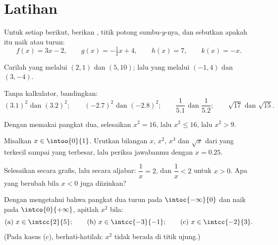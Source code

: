 \section{Latihan}

\begin{exercise}[$\star$]\label{exo:g10:reffunc:1}
Untuk setiap  berikut, berikan , titik potong
sumbu-$y$-nya, dan sebutkan apakah  itu naik atau turun:
\[
f(x) = 3x - 2, \qquad
g(x) = -\tfrac12 x + 4, \qquad
h(x) = 7, \qquad
k(x) = -x .
\]
\end{exercise}

\begin{exercise}[$\star$]\label{exo:g10:reffunc:2}
Carilah  yang  melalui $(2, 1)$ dan
$(5, 10)$; lalu yang melalui $(-1, 4)$ dan $(3, -4)$.
\end{exercise}

\begin{exercise}[$\star$]\label{exo:g10:reffunc:3}
Tanpa kalkulator, bandingkan:
\[
(3.1)^2 \text{ dan } (3.2)^2; \qquad
(-2.7)^2 \text{ dan } (-2.8)^2; \qquad
\frac{1}{5.1} \text{ dan } \frac{1}{5.2}; \qquad
\sqrt{17} \text{ dan } \sqrt{15}.
\]
\end{exercise}

\begin{exercise}[$\star$]\label{exo:g10:reffunc:4}
Dengan memakai   pangkat dua, selesaikan $x^2 = 16$, lalu
$x^2 \leq 16$, lalu $x^2 > 9$.
\end{exercise}

\begin{exercise}[$\star$]\label{exo:g10:reffunc:5}
Misalkan $x \in \intoo{0}{1}$. Urutkan bilangan $x$, $x^2$, $x^3$ dan
$\sqrt x$ dari yang terkecil sampai yang terbesar, lalu periksa jawabanmu
dengan $x = 0.25$.
\end{exercise}

\begin{exercise}[$\star\star$]\label{exo:g10:reffunc:6}
Selesaikan secara grafis, lalu secara aljabar: $\dfrac1x = 2$, dan
$\dfrac1x < 2$ untuk $x > 0$. Apa yang berubah bila $x < 0$ juga diizinkan?
\end{exercise}

\begin{exercise}[$\star\star$]\label{exo:g10:reffunc:7}
Dengan mengetahui bahwa  pangkat dua turun pada $\intoc{-\infty}{0}$ dan
naik pada $\intco{0}{+\infty}$, apitlah $x^2$ bila:
\[
\text{(a) } x \in \intcc{2}{5};
\qquad
\text{(b) } x \in \intcc{-3}{-1};
\qquad
\text{(c) } x \in \intcc{-2}{3}.
\]
(Pada kasus (c), berhati-hatilah:  $x^2$ tidak berada di titik ujung.)
\end{exercise}

